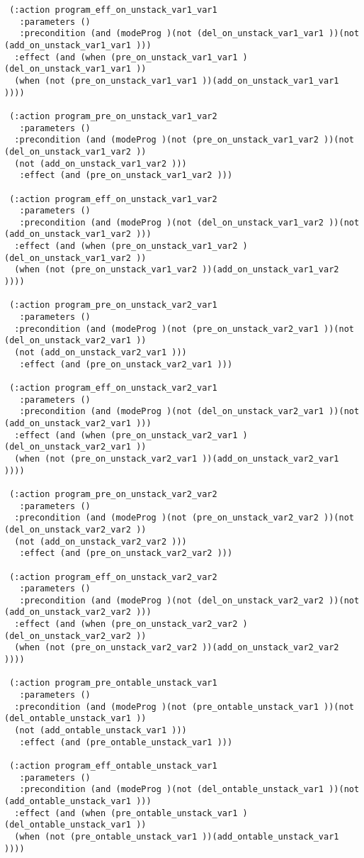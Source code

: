 \begin{scriptsize}
\begin{verbatim}
 (:action program_eff_on_unstack_var1_var1
   :parameters ()
   :precondition (and (modeProg )(not (del_on_unstack_var1_var1 ))(not (add_on_unstack_var1_var1 )))
  :effect (and (when (pre_on_unstack_var1_var1 )(del_on_unstack_var1_var1 ))
  (when (not (pre_on_unstack_var1_var1 ))(add_on_unstack_var1_var1 ))))

 (:action program_pre_on_unstack_var1_var2
   :parameters ()
  :precondition (and (modeProg )(not (pre_on_unstack_var1_var2 ))(not (del_on_unstack_var1_var2 ))
  (not (add_on_unstack_var1_var2 )))
   :effect (and (pre_on_unstack_var1_var2 )))

 (:action program_eff_on_unstack_var1_var2
   :parameters ()
   :precondition (and (modeProg )(not (del_on_unstack_var1_var2 ))(not (add_on_unstack_var1_var2 )))
  :effect (and (when (pre_on_unstack_var1_var2 )(del_on_unstack_var1_var2 ))
  (when (not (pre_on_unstack_var1_var2 ))(add_on_unstack_var1_var2 ))))

 (:action program_pre_on_unstack_var2_var1
   :parameters ()
  :precondition (and (modeProg )(not (pre_on_unstack_var2_var1 ))(not (del_on_unstack_var2_var1 ))
  (not (add_on_unstack_var2_var1 )))
   :effect (and (pre_on_unstack_var2_var1 )))

 (:action program_eff_on_unstack_var2_var1
   :parameters ()
   :precondition (and (modeProg )(not (del_on_unstack_var2_var1 ))(not (add_on_unstack_var2_var1 )))
  :effect (and (when (pre_on_unstack_var2_var1 )(del_on_unstack_var2_var1 ))
  (when (not (pre_on_unstack_var2_var1 ))(add_on_unstack_var2_var1 ))))

 (:action program_pre_on_unstack_var2_var2
   :parameters ()
  :precondition (and (modeProg )(not (pre_on_unstack_var2_var2 ))(not (del_on_unstack_var2_var2 ))
  (not (add_on_unstack_var2_var2 )))
   :effect (and (pre_on_unstack_var2_var2 )))

 (:action program_eff_on_unstack_var2_var2
   :parameters ()
   :precondition (and (modeProg )(not (del_on_unstack_var2_var2 ))(not (add_on_unstack_var2_var2 )))
  :effect (and (when (pre_on_unstack_var2_var2 )(del_on_unstack_var2_var2 ))
  (when (not (pre_on_unstack_var2_var2 ))(add_on_unstack_var2_var2 ))))

 (:action program_pre_ontable_unstack_var1
   :parameters ()
  :precondition (and (modeProg )(not (pre_ontable_unstack_var1 ))(not (del_ontable_unstack_var1 ))
  (not (add_ontable_unstack_var1 )))
   :effect (and (pre_ontable_unstack_var1 )))

 (:action program_eff_ontable_unstack_var1
   :parameters ()
   :precondition (and (modeProg )(not (del_ontable_unstack_var1 ))(not (add_ontable_unstack_var1 )))
  :effect (and (when (pre_ontable_unstack_var1 )(del_ontable_unstack_var1 ))
  (when (not (pre_ontable_unstack_var1 ))(add_ontable_unstack_var1 ))))


\end{verbatim}
\end{scriptsize}

